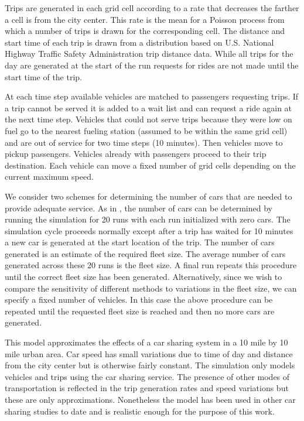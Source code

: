 \documentclass[letterpaper]{article}
\begin{document}
Trips are generated in each grid cell according to a rate that decreases the farther a cell is from the city center. This rate is the mean for a Poisson process from which a number of trips is drawn for the corresponding cell. The distance and start time of each trip is drawn from a distribution based on U.S. National Highway Traffic Safety Administration trip distance data. While all trips for the day are generated at the start of the run requests for rides are not made until the start time of the trip. 

At each time step available vehicles are matched to passengers requesting trips. If a trip cannot be served it is added to a wait list and can request a ride again at the next time step. Vehicles that could not serve trips because they were low on fuel go to the nearest fueling station (assumed to be within the same grid cell) and are out of service for two time steps (10 minutes). Then vehicles move to pickup passengers. Vehicles already with passengers proceed to their trip destination. Each vehicle can move a fixed number of grid cells depending on the current maximum speed.

We consider two schemes for determining the number of cars that are needed to provide adequate service. As in \cite{fagnant2014travel}, the number of cars can be determined by running the simulation for 20 runs with each run initialized with zero cars. The simulation cycle proceeds normally except after a trip has waited for 10 minutes a new car is generated at the start location of the trip. The number of cars generated is an estimate of the required fleet size. The average number of cars generated across these 20 runs is the fleet size. A final run repeats this procedure until the correct fleet size has been generated. Alternatively, since we wish to compare the sensitivity of different methods to variations in the fleet size, we can specify a fixed number of vehicles. In this case the above procedure can be repeated until the requested fleet size is reached and then no more cars are generated.

This model approximates the effects of a car sharing system in a 10 mile by 10 mile urban area. Car speed has small variations due to time of day and distance from the city center but is otherwise fairly constant. The simulation only models vehicles and trips using the car sharing service. The presence of other modes of transportation is reflected in the trip generation rates and speed variations but these are only approximations. Nonetheless the model has been used in other car sharing studies \cite{fagnant2015operations} to date and is realistic enough for the purpose of this work. 
\end{document}
